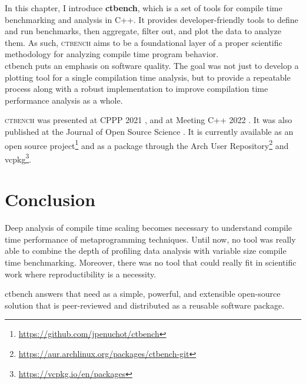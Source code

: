 \documentclass[english,12pt,a4paper]{book}
\providecommand{\cpp}{\textsc{C++}\xspace}
\providecommand{\ctbench}{\textsc{ctbench}\xspace}
\begin{document}
In this chapter, I introduce \textbf{ctbench}, which is a set of tools for
compile time benchmarking and analysis in \cpp. It provides developer-friendly
tools
to define and run benchmarks, then aggregate, filter out, and plot the data to
analyze them. As such, \ctbench aims to be a foundational layer of a proper
scientific methodology for analyzing compile time program behavior.
\\

ctbench puts an emphasis on software quality.
The goal was not just to develop a plotting tool for a single
compilation time analysis, but to provide a repeatable process
along with a robust implementation to improve compilation time
performance analysis as a whole.



\ctbench was presented at CPPP 2021 \cite{ctbench-cppp21},
and at Meeting \cpp 2022 \cite{meetingcpp22}. It was also published
at the Journal of Open Source Science \cite{Penuchot2023}. It is currently
available as an open source
project\footnote{\url{https://github.com/jpenuchot/ctbench}} and as a package
through the Arch User
Repository\footnote{\url{https://aur.archlinux.org/packages/ctbench-git}}
and vcpkg\footnote{\url{https://vcpkg.io/en/packages}}.





\section{
  Conclusion
}

Deep analysis of compile time scaling becomes necessary to understand
compile time performance of metaprogramming techniques.
Until now, no tool was really able to combine the depth of profiling data
analysis with variable size compile time benchmarking.
Moreover, there was no tool that could really fit in scientific work
where reproductibility is a necessity.

ctbench answers that need as a simple, powerful, and extensible
open-source solution that is peer-reviewed and distributed as a reusable
software package.
\end{document}
